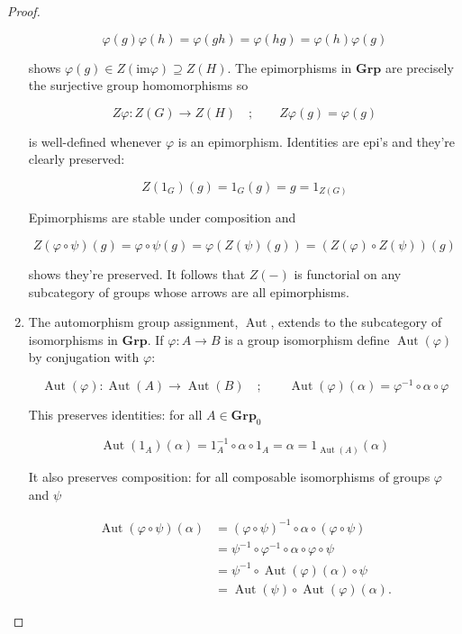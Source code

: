 \documentclass[11pt]{amsart}
\theoremstyle{plain}
\theoremstyle{definition}
\DeclareMathOperator{\Aut}{Aut}
\newcommand{\im}{\text{im}}
\newcommand{\Grp}{\mathbf{Grp}}
\newcommand{\noi}{{\noindent}}
\begin{document}
\begin{proof}
\begin{enumerate}[label=(\alph*)]
\[ \varphi(g) \varphi(h) = \varphi(gh) = \varphi(hg) = \varphi(h) \varphi(g) \] 

\noi shows $\varphi (g) \in Z( \im \varphi ) \supseteq Z(H)$. The epimorphisms in $\Grp$ are precisely the surjective group homomorphisms so 

\[ Z \varphi : Z(G) \to Z(H) \quad ; \qquad Z \varphi(g) = \varphi(g)\]

\noi is well-defined whenever $\varphi$ is an epimorphism. Identities are epi's and they're clearly preserved:

\[ Z(1_G)(g) = 1_G(g) = g = 1_{Z(G)}\]

\noi Epimorphisms are stable under composition and 

\[ Z(\varphi \circ \psi) (g) = \varphi \circ \psi (g) = \varphi \left( Z(\psi) (g)\right) = \left(Z(\varphi) \circ Z(\psi)\right) (g) \]

\noi shows they're preserved. It follows that $Z(-)$ is functorial on any subcategory of groups whose arrows are all epimorphisms. \bigskip 

\item The automorphism group assignment, $\Aut$, extends to the subcategory of isomorphisms in $\Grp$. If $\varphi : A \to B$ is a group isomorphism define $\Aut(\varphi)$ by conjugation with $\varphi$:

\[ \Aut(\varphi) : \Aut(A) \to \Aut(B) \quad ; \qquad \Aut(\varphi) (\alpha) = \varphi^{-1} \circ \alpha \circ \varphi \]

\noi This preserves identities: for all $A \in \Grp_0$ 

\[ \Aut(1_A) (\alpha) = 1_A^{-1} \circ \alpha \circ 1_A = \alpha = 1_{\Aut(A)}(\alpha )\] 

\noi It also preserves composition: for all composable isomorphisms of groups $\varphi$ and $\psi$

\begin{align*} 
\Aut(\varphi \circ \psi )(\alpha) 
&= (\varphi \circ \psi)^{-1} \circ \alpha \circ (\varphi \circ \psi) \\
&=  \psi^{-1} \circ \varphi^{-1} \circ \alpha \circ \varphi \circ \psi \\
&=   \psi^{-1} \circ \Aut(\varphi) (\alpha) \circ \psi \\
&= \Aut(\psi) \circ \Aut(\varphi) (\alpha).
\end{align*} 
\end{enumerate}
\end{proof}
\end{document}
